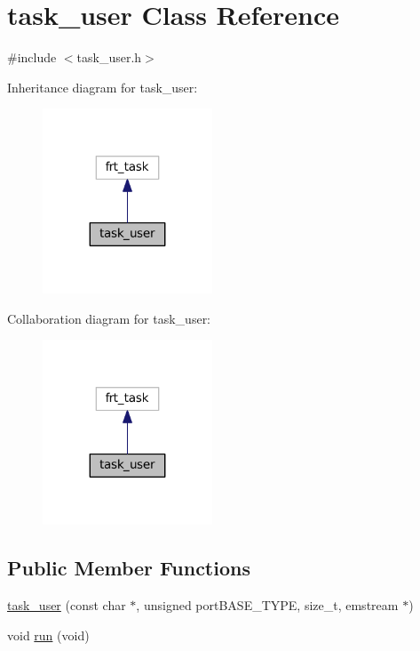 \hypertarget{classtask__user}{}\section{task\+\_\+user Class Reference}
\label{classtask__user}


{\ttfamily \#include $<$task\+\_\+user.\+h$>$}



Inheritance diagram for task\+\_\+user\+:
\nopagebreak
\begin{figure}[H]
\begin{center}
\leavevmode
\includegraphics[width=143pt]{classtask__user__inherit__graph}
\end{center}
\end{figure}


Collaboration diagram for task\+\_\+user\+:
\nopagebreak
\begin{figure}[H]
\begin{center}
\leavevmode
\includegraphics[width=143pt]{classtask__user__coll__graph}
\end{center}
\end{figure}
\subsection*{Public Member Functions}
\begin{DoxyCompactItemize}
\item 
\mbox{\hyperlink{classtask__user_a3aba77563b375bb14838800608da48bc}{task\+\_\+user}} (const char $\ast$, unsigned port\+B\+A\+S\+E\+\_\+\+T\+Y\+PE, size\+\_\+t, emstream $\ast$)
\item 
void \mbox{\hyperlink{classtask__user_adca6429d57be25e8d411414fc8ad75af}{run}} (void)
\end{DoxyCompactItemize}
